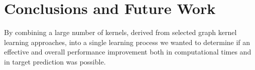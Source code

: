 
\chapter{Conclusions and Future Work}
\label{Chapter5}
By combining a large number of kernels, derived from selected graph kernel
learning approaches, into a single learning process we wanted to determine if an
effective and overall performance improvement both in computational times and 
in target prediction was possible.

